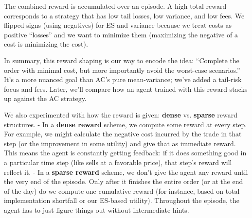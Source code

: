 \documentclass[11pt]{article}
\begin{document}
		The combined reward is accumulated over an episode. A high total reward corresponds to a strategy that has low tail losses, low variance, and low fees. We flipped signs (using negatives) for ES and variance because we treat costs as positive “losses” and we want to minimize them (maximizing the negative of a cost is minimizing the cost).
		
		In summary, this reward shaping is our way to encode the idea: “Complete the order with minimal cost, but more importantly avoid the worst-case scenarios.” It’s a more nuanced goal than AC’s pure mean-variance; we’ve added a tail-risk focus and fees. Later, we’ll compare how an agent trained with this reward stacks up against the AC strategy.
	
	
	
		We also experimented with how the reward is given: \textbf{dense} vs. \textbf{sparse} reward structures.
		- In a \textbf{dense reward} scheme, we compute some reward at every step. For example, we might calculate the negative cost incurred by the trade in that step (or the improvement in some utility) and give that as immediate reward. This means the agent is constantly getting feedback: if it does something good in a particular time step (like sells at a favorable price), that step’s reward will reflect it.
		- In a \textbf{sparse reward} scheme, we don’t give the agent any reward until the very end of the episode. Only after it finishes the entire order (or at the end of the day) do we compute one cumulative reward (for instance, based on total implementation shortfall or our ES-based utility). Throughout the episode, the agent has to just figure things out without intermediate hints.
		
\end{document}
